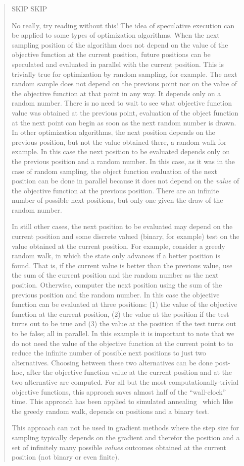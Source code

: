 \documentclass[journal,letterpaper]{IEEEtran}
\begin{document}
\begin{quote}
SKIP SKIP

No really, try reading without this! The idea of speculative execution can be applied to some types of optimization
algorithms.  When the next sampling position of the algorithm does not depend
on the value of the objective function at the current position,
future positions can be speculated and evaluated in parallel with the current
position.
This is trivially true for optimization by random sampling, for example.
The next random sample does not depend on the previous point nor on the value
of the objective function at that point in any way.
It depends only on a random number.
There is no need to wait to see
what objective function value was obtained at the previous point,
evaluation of the object function at the next point can begin as soon as the next random number is drawn.
In other optimization algorithms, the next position depends on the previous position, but not the
value obtained there, a random walk for example.
In this case
the next position to be evaluated
depends only on the previous position and a random number.
In this case, as it was in the case of random sampling,
the object function evaluation of the next position can be done in parallel
because it 
does not depend on the \emph{value} of the objective function at the previous position.
There are an infinite number of possible next positions, but only one given the draw of the random number.

In still other cases, the next position to be evaluated may depend on the current position and some
discrete valued (binary, for example) test on the value obtained at the current position.
For example, consider a greedy random walk, in which the state only advances if a better
position is found.
That is, if the current value is better than the previous value,
use the sum of the current position and the random number as the next position.
Otherwise, computer the next position using the sum of the previous position and the random number.
In this case the objective function can be evaluated at three positions:
(1) the value of the objective function at the current position,
(2) the value at the position if the test turns out to be true and (3) the value at the position
if the test turns out to be false; all in parallel.
In this example it is important to note that we do not need the value of the objective function at the current
point to to reduce the infinite number of possible next positions to just two alternatives.
Choosing between these two alternatives can be done post-hoc, after the objective function value
at the current position and at the two alternative are computed.
For all but the most computationally-trivial objective functions, this approach saves almost half of the
``wall-clock'' time.
This approach has been applied to simulated annealing~\cite{witte-tpds91} which like the greedy random walk,
depends on positions and a binary test.

This approach can not be used in gradient methods where the
step size for sampling typically depends on the gradient and therefor the position and 
a set of infinitely many possible \emph{values} outcomes
obtained at the current position (not binary or even finite).
\end{quote}
\end{document}
